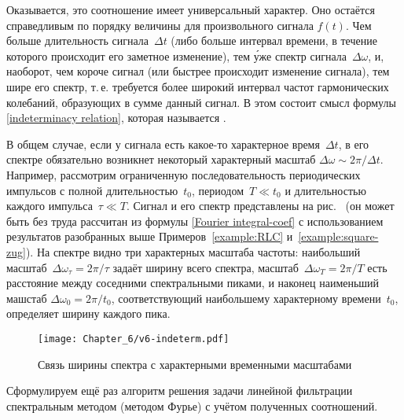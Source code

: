 Оказывается, это соотношение имеет универсальный характер.
Оно остаётся справедливым по порядку величины для произвольного сигнала $f(t)$.
Чем больше длительность сигнала~$\Delta t$ (либо больше интервал времени,
в течение которого происходит его заметное изменение), тем \'{у}же спектр
сигнала~$\Delta\omega$, и, наоборот, чем короче сигнал (или быстрее происходит
изменение сигнала), тем шире его спектр, т.\,е. требуется более широкий интервал
частот гармонических колебаний, образующих в сумме данный сигнал.
В этом состоит смысл формулы \eqref{indeterminacy relation},
которая называется .

В общем случае, если у сигнала есть какое-то характерное время~$\Delta t$,
в его спектре обязательно возникнет некоторый характерный масштаб
$\Delta \omega \sim 2\pi /\Delta t$. Например, рассмотрим ограниченную
последовательность периодических импульсов с полной длительностью~$t_0$,
периодом~$T\ll t_0$ и длительностью каждого импульса~$\tau\ll T$.
Сигнал и его спектр представлены на рис.~
(он может быть без труда рассчитан из формулы \eqref{Fourier integral-coef}
с использованием результатов разобранных выше Примеров~\ref{example:RLC}
и~\ref{example:square-zug}). На спектре видно три характерных масштаба частоты:
наибольший масштаб~$\Delta \omega_{\tau} = 2\pi/\tau$ задаёт ширину всего спектра,
масштаб~$\Delta \omega_T = 2\pi / T$ есть расстояние между соседними
спектральными пиками, и наконец наименьший машстаб $\Delta \omega_0 = 2\pi /t_0$,
соответствующий наибольшему характерному времени~$t_0$,
определяет ширину каждого пика.

\begin{figure}[h!]
\centering\texttt{[image: Chapter\_6/v6-indeterm.pdf]}
\caption{Связь ширины спектра с характерными временными масштабами}
\end{figure}


Сформулируем ещё раз алгоритм решения задачи линейной фильтрации
спектральным методом (методом Фурье) с учётом полученных соотношений.

